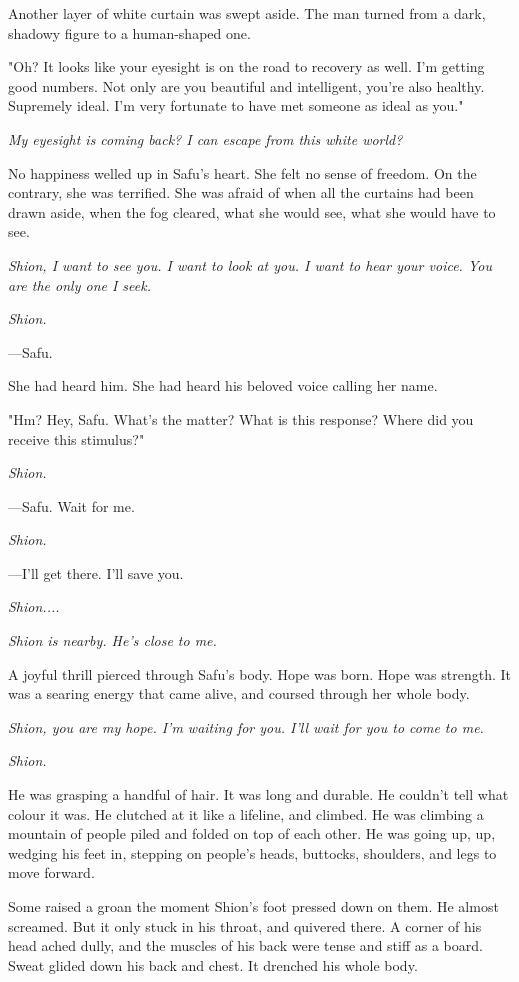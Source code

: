 Another layer of white curtain was swept aside. The man turned from a
dark, shadowy figure to a human-shaped one.

"Oh? It looks like your eyesight is on the road to recovery as well. I'm
getting good numbers. Not only are you beautiful and intelligent, you're
also healthy. Supremely ideal. I'm very fortunate to have met someone as
ideal as you."

\emph{My eyesight is coming back? I can escape from this white world?}

No happiness welled up in Safu's heart. She felt no sense of freedom. On
the contrary, she was terrified. She was afraid of when all the curtains
had been drawn aside, when the fog cleared, what she would see, what she
would have to see.

\emph{Shion, I want to see you. I want to look at you. I want to hear your
voice. You are the only one I seek.}

\emph{Shion.}

---Safu.

She had heard him. She had heard his beloved voice calling her name.

"Hm? Hey, Safu. What's the matter? What is this response? Where did you
receive this stimulus?"

\emph{Shion.}

---Safu. Wait for me.

\emph{Shion.}

---I'll get there. I'll save you.

\emph{Shion....}

\emph{Shion is nearby. He's close to me.}

A joyful thrill pierced through Safu's body. Hope was born. Hope was
strength. It was a searing energy that came alive, and coursed through
her whole body.

\emph{Shion, you are my hope. I'm waiting for you. I'll wait for you to come
to me.}

\emph{Shion.}

\mybreak

He was grasping a handful of hair. It was long and durable. He couldn't
tell what colour it was. He clutched at it like a lifeline, and climbed.
He was climbing a mountain of people piled and folded on top of each
other. He was going up, up, wedging his feet in, stepping on people's
heads, buttocks, shoulders, and legs to move forward.

Some raised a groan the moment Shion's foot pressed down on them. He
almost screamed. But it only stuck in his throat, and quivered there. A
corner of his head ached dully, and the muscles of his back were tense
and stiff as a board. Sweat glided down his back and chest. It drenched
his whole body.

